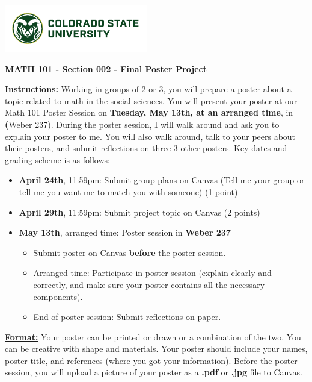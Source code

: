 \documentclass[12pt]{article}
\begin{document}
\includegraphics{CSUSig}

\begin{center}
    {\large\textbf{MATH 101 - Section 002 - Final Poster Project}}
\end{center}
\textbf{\underline{Instructions:}} Working in groups of 2 or 3, you will prepare a poster about a topic related to math in the social sciences. You will present your poster at our Math 101 Poster Session on {\textbf{Tuesday, May 13th, at an arranged time}, in \textbf(Weber 237)}. During the poster session, I will walk around and ask you to explain your poster to me. You will also walk around, talk to your peers about their posters, and submit reflections on three 3 other posters. Key dates and grading scheme is as follows:

\begin{itemize}
    \item \textbf{April 24th}, 11:59pm: Submit group plans on Canvas (Tell me your group or tell me you want me to match you with someone) (1 point)
    \item \textbf{April 29th}, 11:59pm: Submit project topic on Canvas (2 points)
    \item \textbf{May 13th}, arranged time: Poster session in \textbf{Weber 237}
        \begin{itemize}
            \item Submit poster on Canvas \textbf{before} the poster session.
            \item Arranged time: Participate in poster session (explain clearly and correctly, and make sure your poster contains all the necessary components).
             \item End of poster session: Submit reflections on paper.
             \end{itemize}
\end{itemize}

\textbf{\underline{Format:}} Your poster can be printed or drawn or a combination of the two. You can be creative with shape and materials. Your poster should include your names, poster title, and references (where you got your information). Before the poster session, you will upload a picture of your poster as a \textbf{.pdf} or \textbf{.jpg} file to Canvas. 
\end{document}
